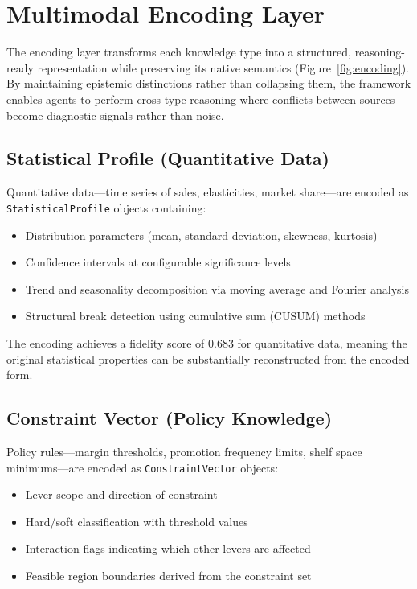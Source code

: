 \documentclass[11pt,a4paper]{article}
\begin{document}



\section{Multimodal Encoding Layer}
\label{sec:encoding}

The encoding layer transforms each knowledge type into a structured, reasoning-ready representation while preserving its native semantics (Figure~\ref{fig:encoding}).
By maintaining epistemic distinctions rather than collapsing them, the framework enables agents to perform cross-type reasoning where conflicts between sources become diagnostic signals rather than noise.

\subsection{Statistical Profile (Quantitative Data)}

Quantitative data---time series of sales, elasticities, market share---are encoded as \texttt{StatisticalProfile} objects containing:
\begin{itemize}
    \item Distribution parameters (mean, standard deviation, skewness, kurtosis)
    \item Confidence intervals at configurable significance levels
    \item Trend and seasonality decomposition via moving average and Fourier analysis
    \item Structural break detection using cumulative sum (CUSUM) methods
\end{itemize}

The encoding achieves a fidelity score of 0.683 for quantitative data, meaning the original statistical properties can be substantially reconstructed from the encoded form.

\subsection{Constraint Vector (Policy Knowledge)}

Policy rules---margin thresholds, promotion frequency limits, shelf space minimums---are encoded as \texttt{ConstraintVector} objects:
\begin{itemize}
    \item Lever scope and direction of constraint
    \item Hard/soft classification with threshold values
    \item Interaction flags indicating which other levers are affected
    \item Feasible region boundaries derived from the constraint set
\end{itemize}
\end{document}
